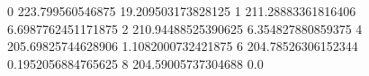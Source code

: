 0 223.799560546875 19.209503173828125
1 211.28883361816406 6.6987762451171875
2 210.94488525390625 6.354827880859375
4 205.69825744628906 1.1082000732421875
6 204.78526306152344 0.1952056884765625
8 204.59005737304688 0.0
